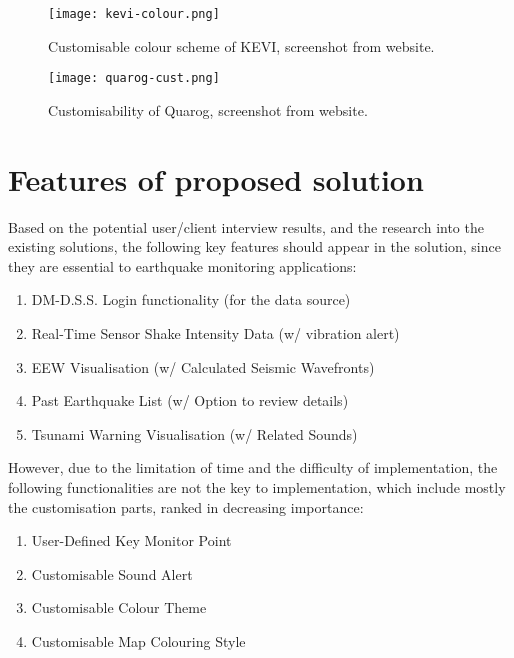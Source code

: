 \begin{figure}[!ht]
    \centering

    \texttt{[image: kevi-colour.png]}
    \caption[Customisable colour scheme of KEVI]{Customisable colour scheme of KEVI, screenshot from website.}
    \label{fig:kevi-colour-cust}
\end{figure}

\begin{figure}[!ht]
    \centering

    \texttt{[image: quarog-cust.png]}
    \caption[Customisability of Quarog]{Customisability of Quarog, screenshot from website.}
    \label{fig:quarog-cust}
\end{figure}


\section{Features of proposed solution}

Based on the potential user/client interview results, and the research into the existing solutions, the following key features should appear in the solution, since they are essential to earthquake monitoring applications:
\begin{enumerate}
    \item DM-D.S.S. Login functionality (for the data source)
    \item Real-Time Sensor Shake Intensity Data (w/ vibration alert)
    \item EEW Visualisation (w/ Calculated Seismic Wavefronts)
    \item Past Earthquake List (w/ Option to review details)
    \item Tsunami Warning Visualisation (w/ Related Sounds)
\end{enumerate}

However, due to the limitation of time and the difficulty of implementation, the following functionalities are not the key to implementation, which include mostly the customisation parts, ranked in decreasing importance:
\begin{enumerate}
    \item User-Defined Key Monitor Point
    \item Customisable Sound Alert
    \item Customisable Colour Theme
    \item Customisable Map Colouring Style
\end{enumerate}

